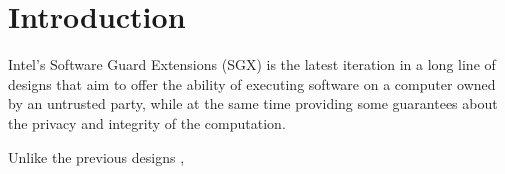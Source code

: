 \section{Introduction}
\label{sec:intro}

Intel's Software Guard Extensions (SGX) is the latest iteration in a long line
of designs that aim to offer the ability of executing software on a computer
owned by an untrusted party, while at the same time providing some guarantees
about the privacy and integrity of the computation.




Unlike the previous designs \cite{tpm} \cite{grawrock2009txt},
